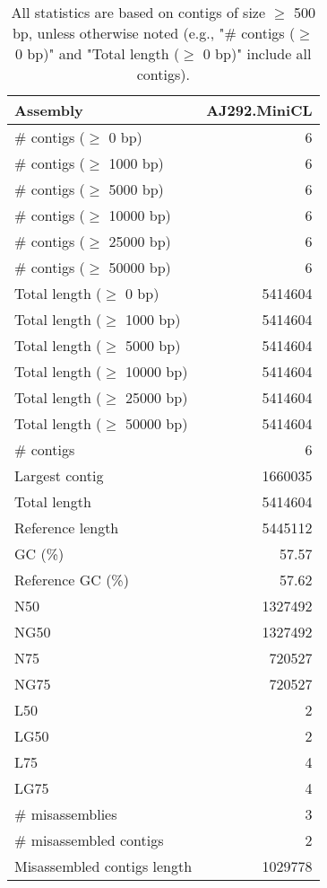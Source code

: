 \documentclass[12pt,a4paper]{article}
\begin{document}
\begin{table}[ht]
\begin{center}
\caption{All statistics are based on contigs of size $\geq$ 500 bp, unless otherwise noted (e.g., "\# contigs ($\geq$ 0 bp)" and "Total length ($\geq$ 0 bp)" include all contigs).}
\begin{tabular}{|l*{1}{|r}|}
\hline
Assembly & AJ292.MiniCL \\ \hline
\# contigs ($\geq$ 0 bp) & 6 \\ \hline
\# contigs ($\geq$ 1000 bp) & 6 \\ \hline
\# contigs ($\geq$ 5000 bp) & 6 \\ \hline
\# contigs ($\geq$ 10000 bp) & 6 \\ \hline
\# contigs ($\geq$ 25000 bp) & 6 \\ \hline
\# contigs ($\geq$ 50000 bp) & 6 \\ \hline
Total length ($\geq$ 0 bp) & 5414604 \\ \hline
Total length ($\geq$ 1000 bp) & 5414604 \\ \hline
Total length ($\geq$ 5000 bp) & 5414604 \\ \hline
Total length ($\geq$ 10000 bp) & 5414604 \\ \hline
Total length ($\geq$ 25000 bp) & 5414604 \\ \hline
Total length ($\geq$ 50000 bp) & 5414604 \\ \hline
\# contigs & 6 \\ \hline
Largest contig & 1660035 \\ \hline
Total length & 5414604 \\ \hline
Reference length & 5445112 \\ \hline
GC (\%) & 57.57 \\ \hline
Reference GC (\%) & 57.62 \\ \hline
N50 & 1327492 \\ \hline
NG50 & 1327492 \\ \hline
N75 & 720527 \\ \hline
NG75 & 720527 \\ \hline
L50 & 2 \\ \hline
LG50 & 2 \\ \hline
L75 & 4 \\ \hline
LG75 & 4 \\ \hline
\# misassemblies & 3 \\ \hline
\# misassembled contigs & 2 \\ \hline
Misassembled contigs length & 1029778 \\ \hline

\end{tabular}
\end{center}
\end{table}
\end{document}
